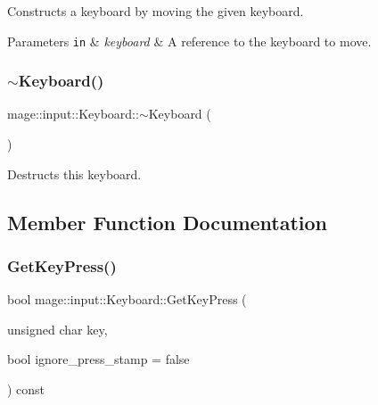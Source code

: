 Constructs a keyboard by moving the given keyboard.


\begin{DoxyParams}[1]{Parameters}
\mbox{\tt in}  & {\em keyboard} & A reference to the keyboard to move. \\
\hline
\end{DoxyParams}
\hypertarget{classmage_1_1input_1_1_keyboard_a71239cd5326f78ab226f145a430b382b}{}\label{classmage_1_1input_1_1_keyboard_a71239cd5326f78ab226f145a430b382b} 
\subsubsection{\texorpdfstring{$\sim$\+Keyboard()}{~Keyboard()}}
{\footnotesize\ttfamily mage\+::input\+::\+Keyboard\+::$\sim$\+Keyboard (\begin{DoxyParamCaption}{ }\end{DoxyParamCaption})\hspace{0.3cm}{\ttfamily [default]}}

Destructs this keyboard. 

\subsection{Member Function Documentation}
\hypertarget{classmage_1_1input_1_1_keyboard_a287feaae6c0bf0a93b97f29a601b177a}{}\label{classmage_1_1input_1_1_keyboard_a287feaae6c0bf0a93b97f29a601b177a} 
\subsubsection{\texorpdfstring{Get\+Key\+Press()}{GetKeyPress()}}
{\footnotesize\ttfamily bool mage\+::input\+::\+Keyboard\+::\+Get\+Key\+Press (\begin{DoxyParamCaption}\item[{unsigned char}]{key,  }\item[{bool}]{ignore\+\_\+press\+\_\+stamp = {\ttfamily false} }\end{DoxyParamCaption}) const\hspace{0.3cm}{\ttfamily [noexcept]}}

